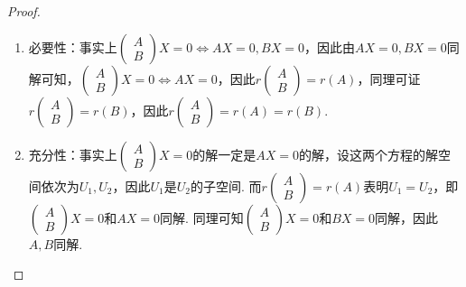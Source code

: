 \begin{proof}
    \begin{enumerate}
        \item 必要性：事实上$\begin{pmatrix}
                      A \\ B
                  \end{pmatrix}X=0\iff AX=0,BX=0$，因此由$AX=0,BX=0$同解可知，$\begin{pmatrix}
                      A \\ B
                  \end{pmatrix}X=0\iff AX=0$，因此$r\begin{pmatrix}
                      A \\ B
                  \end{pmatrix}=r(A)$，同理可证$r\begin{pmatrix}
                      A \\ B
                  \end{pmatrix}=r(B)$，因此$r\begin{pmatrix}
                      A \\ B
                  \end{pmatrix}=r(A)=r(B)$.

        \item 充分性：事实上$\begin{pmatrix}
                      A \\ B
                  \end{pmatrix}X=0$的解一定是$AX=0$的解，设这两个方程的解空间依次为$U_1,U_2$，因此$U_1$是$U_2$的子空间. 而$r\begin{pmatrix}
                      A \\ B
                  \end{pmatrix}=r(A)$表明$U_1=U_2$，即$\begin{pmatrix}
                      A \\ B
                  \end{pmatrix}X=0$和$AX=0$同解. 同理可知$\begin{pmatrix}
                      A \\ B
                  \end{pmatrix}X=0$和$BX=0$同解，因此$A,B$同解.
    \end{enumerate}
\end{proof}

